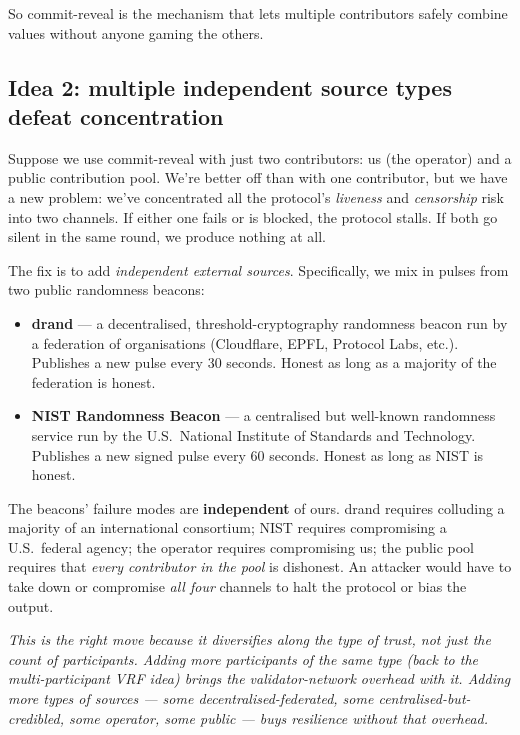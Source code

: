 \documentclass[11pt]{article}
\newenvironment{aside}{\par\medskip\noindent\itshape\small\color{black!70}}{\normalfont\par\medskip}
\begin{document}
So commit-reveal is the mechanism that lets multiple contributors safely combine values without anyone gaming the others.

\subsection*{Idea 2: multiple independent source types defeat concentration}

Suppose we use commit-reveal with just two contributors: us (the operator) and a public contribution pool. We're better off than with one contributor, but we have a new problem: we've concentrated all the protocol's \emph{liveness} and \emph{censorship} risk into two channels. If either one fails or is blocked, the protocol stalls. If both go silent in the same round, we produce nothing at all.

The fix is to add \emph{independent external sources}. Specifically, we mix in pulses from two public randomness beacons:

\begin{itemize}[leftmargin=2em, itemsep=4pt]
\item \textbf{drand} --- a decentralised, threshold-cryptography randomness beacon run by a federation of organisations (Cloudflare, EPFL, Protocol Labs, etc.). Publishes a new pulse every 30 seconds. Honest as long as a majority of the federation is honest.
\item \textbf{NIST Randomness Beacon} --- a centralised but well-known randomness service run by the U.S.\ National Institute of Standards and Technology. Publishes a new signed pulse every 60 seconds. Honest as long as NIST is honest.
\end{itemize}

The beacons' failure modes are \textbf{independent} of ours. drand requires colluding a majority of an international consortium; NIST requires compromising a U.S.\ federal agency; the operator requires compromising us; the public pool requires that \emph{every contributor in the pool} is dishonest. An attacker would have to take down or compromise \emph{all four} channels to halt the protocol or bias the output.

\begin{aside}
This is the right move because it diversifies along the \emph{type} of trust, not just the \emph{count} of participants. Adding more participants of the same type (back to the multi-participant VRF idea) brings the validator-network overhead with it. Adding more \emph{types} of sources --- some decentralised-federated, some centralised-but-credibled, some operator, some public --- buys resilience without that overhead.
\end{aside}
\end{document}
